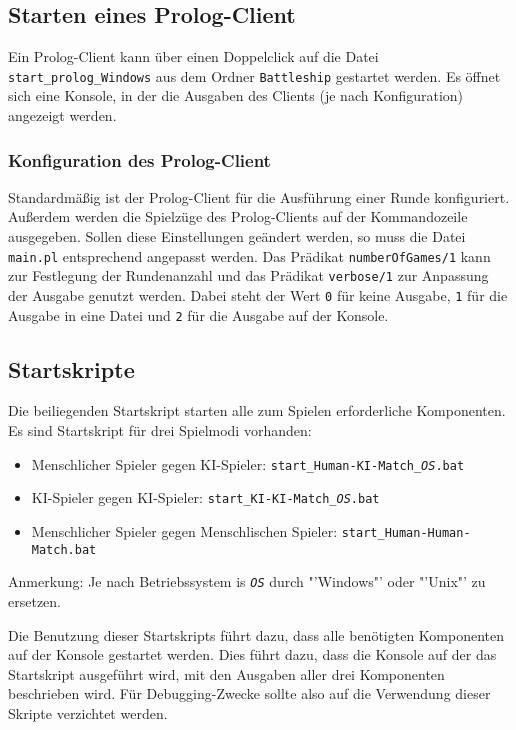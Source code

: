 \subsection{Starten eines Prolog-Client}
	Ein Prolog-Client kann über einen Doppelclick auf die Datei \texttt{start\_prolog\_Windows} aus dem Ordner 
	\texttt{Battleship} 
	gestartet werden. Es öffnet sich eine Konsole, in der die Ausgaben des Clients (je nach Konfiguration) angezeigt werden.
	
	\subsubsection {Konfiguration des Prolog-Client}
		Standardmäßig ist der Prolog-Client für die Ausführung einer Runde konfiguriert. Außerdem werden die Spielzüge des Prolog-Clients auf
		der Kommandozeile ausgegeben. Sollen diese Einstellungen geändert werden, so muss die Datei \texttt{main.pl} entsprechend angepasst werden.
		Das Prädikat \texttt{numberOfGames/1} kann zur Festlegung der Rundenanzahl und das Prädikat \texttt{verbose/1} zur Anpassung der Ausgabe 
		genutzt werden. Dabei steht der Wert \texttt{0} für keine Ausgabe, \texttt{1} für die Ausgabe in eine Datei und \texttt{2} für 
		die Ausgabe auf der Konsole.
\subsection{Startskripte} %
\label{sub:startskripte}
	Die beiliegenden Startskript starten alle zum Spielen erforderliche Komponenten. Es sind Startskript für drei Spielmodi vorhanden:
	\begin{itemize}
		\item Menschlicher Spieler gegen KI-Spieler: \texttt{start\_Human-KI-Match\_\emph{OS}.bat}
		\item KI-Spieler gegen KI-Spieler: \texttt{start\_KI-KI-Match\_\emph{OS}.bat}
		\item Menschlicher Spieler gegen Menschlischen Spieler: \texttt{start\_Human-Human-Match.bat}
	\end{itemize}
	Anmerkung: Je nach Betriebssystem is \texttt{\emph{OS}} durch "'Windows"' oder "'Unix"' zu ersetzen.
	
	Die Benutzung dieser Startskripts führt dazu, dass alle benötigten Komponenten auf der Konsole gestartet werden. Dies führt dazu, dass die Konsole 
	auf der das Startskript ausgeführt wird, mit den Ausgaben aller drei Komponenten beschrieben wird. Für Debugging-Zwecke sollte also auf die Verwendung dieser 
	Skripte verzichtet werden.
